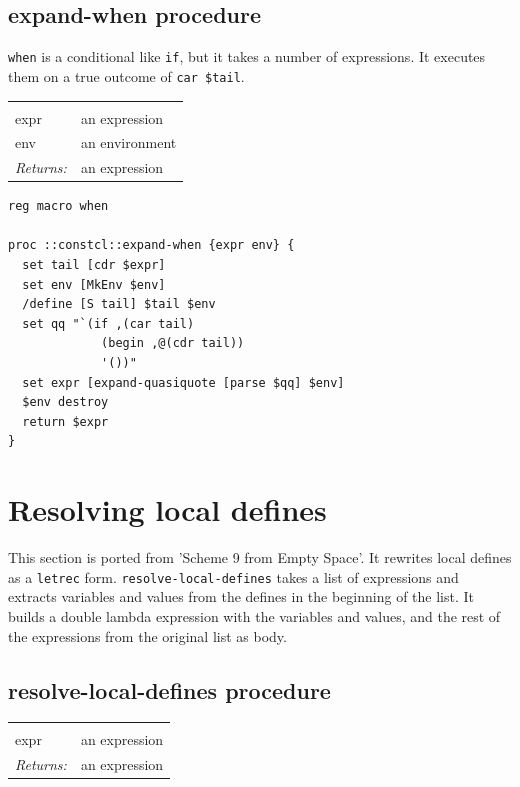 \documentclass[a5paper,draft]{memoir}
\begin{document}
\subsection{expand-when procedure}
\label{expandwhen-procedure}

\texttt{when} is a conditional like \texttt{if}, but it takes a number of expressions. It executes them on a true outcome of \texttt{car \$tail}.

\noindent\begin{tabular}{ |p{1.9cm} p{6.5cm}| }
\hline
\rowcolor[HTML]{CCCCCC} \multicolumn{2}{|l|}{\textbf{expand-when (internal)}} \\
expr & an expression \\
env & an environment \\
\textit{Returns:} & an expression \\
\hline
\end{tabular}

\begin{lstlisting}
reg macro when

proc ::constcl::expand-when {expr env} {
  set tail [cdr $expr]
  set env [MkEnv $env]
  /define [S tail] $tail $env
  set qq "`(if ,(car tail)
             (begin ,@(cdr tail))
             '())"
  set expr [expand-quasiquote [parse $qq] $env]
  $env destroy
  return $expr
}
\end{lstlisting}

\section{Resolving local defines}
\label{resolving-local-defines}

This section is ported from 'Scheme 9 from Empty Space'. It rewrites local defines as a \texttt{letrec} form. \texttt{resolve-local-defines} takes a list of expressions and extracts variables and values from the defines in the beginning of the list. It builds a double lambda expression with the variables and values, and the rest of the expressions from the original list as body.

\subsection{resolve-local-defines procedure}
\label{resolvelocaldefines-procedure}

\noindent\begin{tabular}{ |p{1.9cm} p{6.5cm}| }
\hline
\rowcolor[HTML]{CCCCCC} \multicolumn{2}{|l|}{\textbf{resolve-local-defines}} \\
expr & an expression \\
\textit{Returns:} & an expression \\
\hline
\end{tabular}
\end{document}
